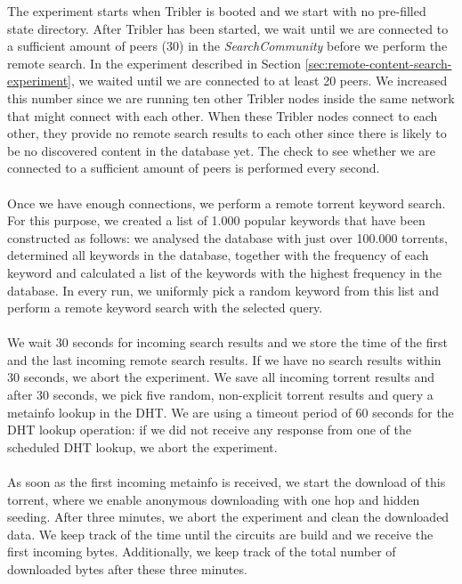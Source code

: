 The experiment starts when Tribler is booted and we start with no pre-filled state directory. After Tribler has been started, we wait until we are connected to a sufficient amount of peers (30) in the \emph{SearchCommunity} before we perform the remote search. In the experiment described in Section \ref{sec:remote-content-search-experiment}, we waited until we are connected to at least 20 peers. We increased this number since we are running ten other Tribler nodes inside the same network that might connect with each other. When these Tribler nodes connect to each other, they provide no remote search results to each other since there is likely to be no discovered content in the database yet. The check to see whether we are connected to a sufficient amount of peers is performed every second.\\\\
Once we have enough connections, we perform a remote torrent keyword search. For this purpose, we created a list of 1.000 popular keywords that have been constructed as follows: we analysed the database with just over 100.000 torrents, determined all keywords in the database, together with the frequency of each keyword and calculated a list of the keywords with the highest frequency in the database. In every run, we uniformly pick a random keyword from this list and perform a remote keyword search with the selected query.\\\\
We wait 30 seconds for incoming search results and we store the time of the first and the last incoming remote search results. If we have no search results within 30 seconds, we abort the experiment. We save all incoming torrent results and after 30 seconds, we pick five random, non-explicit torrent results and query a metainfo lookup in the DHT. We are using a timeout period of 60 seconds for the DHT lookup operation: if we did not receive any response from one of the scheduled DHT lookup, we abort the experiment.\\\\
As soon as the first incoming metainfo is received, we start the download of this torrent, where we enable anonymous downloading with one hop and hidden seeding. After three minutes, we abort the experiment and clean the downloaded data. We keep track of the time until the circuits are build and we receive the first incoming bytes. Additionally, we keep track of the total number of downloaded bytes after these three minutes.\\\\
